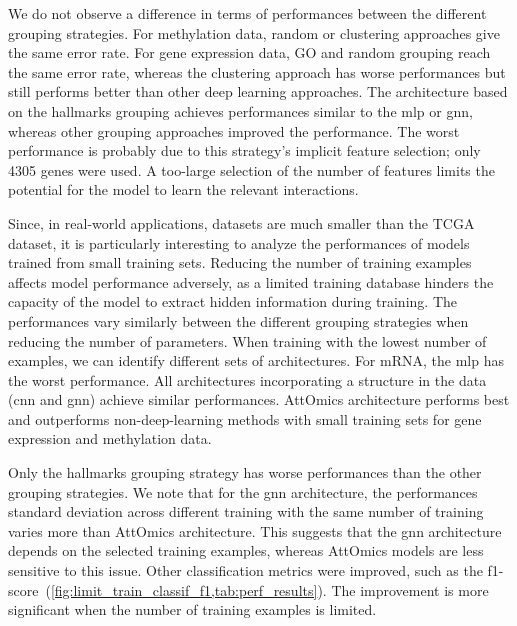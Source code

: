 \documentclass[../main.tex]{subfiles}
\begin{document}
	    We do not observe a difference in terms of performances between the different grouping strategies.
	    For methylation data, random or clustering approaches give the same error rate.
	    For gene expression data, GO and random grouping reach the same error rate, whereas the clustering approach has worse performances but still performs better than other deep learning approaches.
	    The architecture based on the hallmarks grouping achieves performances similar to the \gls{mlp} or \gls{gnn}, whereas other grouping approaches improved the performance.
	    The worst performance is probably due to this strategy's implicit feature selection; only 4305 genes were used.
	    A too-large selection of the number of features limits the potential for the model to learn the relevant interactions.

	    Since, in real-world applications, datasets are much smaller than the TCGA dataset, it is particularly interesting to analyze the performances of models trained from small training sets.
	    Reducing the number of training examples affects model performance adversely, as a limited training database hinders the capacity of the model to extract hidden information during training.
	    The performances vary similarly between the different grouping strategies when reducing the number of parameters.
	    When training with the lowest number of examples, we can identify different sets of architectures.
	    For mRNA, the \gls{mlp} has the worst performance.
	    All architectures incorporating a structure in the data (\gls{cnn} and \gls{gnn}) achieve similar performances.
	    AttOmics architecture performs best and outperforms non-deep-learning methods with small training sets for gene expression and methylation data.

	    Only the hallmarks grouping strategy has worse performances than the other grouping strategies.
	    We note that for the \gls{gnn} architecture, the performances standard deviation across different training with the same number of training varies more than AttOmics architecture.
	    This suggests that the \gls{gnn} architecture depends on the selected training examples, whereas AttOmics models are less sensitive to this issue.
	    Other classification metrics were improved, such as the f1-score~(\cref{fig:limit_train_classif_f1,tab:perf_results}).
	    The improvement is more significant when the number of training examples is limited.
\end{document}
